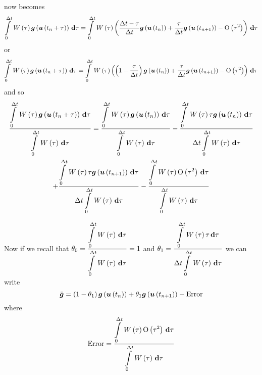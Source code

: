 now becomes
\begin{equation}
  \gint{0}{\Delta t}{\fnof{W}{\tau}\fnof{\vectr{g}}{\fnof{\vectr{u}}{t_{n}+\tau}}}{\tau}
  =\gint{0}{\Delta t}{\fnof{W}{\tau}
      \pbrac{\dfrac{\Delta t-\tau}{\Delta t}\fnof{\vectr{g}}{\fnof{\vectr{u}}{t_{n}}}+
        \dfrac{\tau}{\Delta t}\fnof{\vectr{g}}{\fnof{\vectr{u}}{t_{n+1}}}-\orderof{\tau^{2}}}}{\tau}
\end{equation}
or
\begin{equation}
  \gint{0}{\Delta t}{\fnof{W}{\tau}\fnof{\vectr{g}}{\fnof{\vectr{u}}{t_{n}+\tau}}}{\tau}
  =\gint{0}{\Delta t}{\fnof{W}{\tau}
      \pbrac{\pbrac{1-\dfrac{\tau}{{\Delta t}}}\fnof{\vectr{g}}{\fnof{\vectr{u}}{t_{n}}}+
        \dfrac{\tau}{\Delta t}\fnof{\vectr{g}}{\fnof{\vectr{u}}{t_{n+1}}}-\orderof{\tau^{2}}}}{\tau}
\end{equation}
and so
\begin{multline}
\dfrac{\gint{0}{\Delta t}{\fnof{W}{\tau}
      \fnof{\vectr{g}}{\fnof{\vectr{u}}{t_{n}+\tau}}}{\tau}}{\gint{0}{\Delta
      t}{\fnof{W}{\tau}}{\tau}}=\dfrac{\gint{0}{\Delta
      t}{\fnof{W}{\tau}\fnof{\vectr{g}}{\fnof{\vectr{u}}{t_{n}}}}{\tau}}{\gint{0}{\Delta
    t}{\fnof{W}{\tau}}{\tau}}
-\dfrac{\gint{0}{\Delta
    t}{\fnof{W}{\tau}\tau\fnof{\vectr{g}}{\fnof{\vectr{u}}{t_{n}}}}{\tau}}{\Delta
  t\gint{0}{\Delta
    t}{\fnof{W}{\tau}}{\tau}} \\
+\dfrac{\gint{0}{\Delta
    t}{\fnof{W}{\tau}\tau\fnof{\vectr{g}}{\fnof{\vectr{u}}{t_{n+1}}}}{\tau}}{\Delta
  t\gint{0}{\Delta
    t}{\fnof{W}{\tau}}{\tau}}- 
  \dfrac{\gint{0}{\Delta
      t}{\fnof{W}{\tau}\orderof{\tau^{2}}}{\tau}}{\gint{0}{\Delta t}{\fnof{W}{\tau}}{\tau}}
\end{multline}

Now if we recall that $\theta_{0}=\dfrac{\gint{0}{\Delta
    t}{\fnof{W}{\tau}}{\tau}}{\gint{0}{\Delta t}{\fnof{W}{\tau}}{\tau}}=1$ and
$\theta_{1}=\dfrac{\gint{0}{\Delta t}{\fnof{W}{\tau}\tau}{\tau}}{\Delta
  t\gint{0}{\Delta t}{\fnof{W}{\tau}}{\tau}}$
we can write
\begin{equation}
  \bar{\vect{g}}=\pbrac{1-\theta_{1}}\fnof{\vectr{g}}{\fnof{\vectr{u}}{t_{n}}}+
  \theta_{1}\fnof{\vectr{g}}{\fnof{\vectr{u}}{t_{n+1}}}-\text{Error}
\end{equation}
where
\begin{equation}
  \text{Error}=\dfrac{\gint{0}{\Delta t}{\fnof{W}{\tau}\orderof{\tau^{2}}}{\tau}}{
    \gint{0}{\Delta t}{\fnof{W}{\tau}}{\tau}}
\end{equation}

